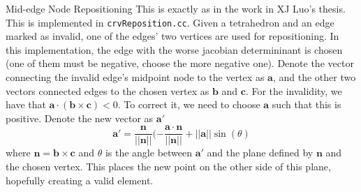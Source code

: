 \documentclass[12pt]{beamer}
\newcommand{\spa}{\vspace{0.5cm}\newline}
\begin{document}
\begin{frame}{Mid-edge Node Repositioning}
This is exactly as in the work in XJ Luo's thesis. This is implemented in \texttt{crvReposition.cc}. Given a tetrahedron and an edge marked as invalid, one of the edges' two vertices are used for repositioning. In this implementation, the edge with the worse jacobian determininant is chosen (one of them must be negative, choose the more negative one). \spa
Denote the vector connecting the invalid edge's midpoint node to the vertex as $\mathbf{a}$, and the other two vectors connected edges to the chosen vertex as $\mathbf{b}$ and $\mathbf{c}$. For the invalidity, we have that $\mathbf{a}\cdot (\mathbf{b}\times\mathbf{c}) < 0$. To correct it, we need to choose $\mathbf{a}$ such that this is positive. \spa
Denote the new vector as $\mathbf{a}'$ 
\[
\mathbf{a}' = \frac{\mathbf{n}}{||\mathbf{n}||}(-\frac{\mathbf{a}\cdot \mathbf{n}}{||\mathbf{n}||} + ||\mathbf{a}||\sin(\theta)
\]
where $\mathbf{n} = \mathbf{b}\times\mathbf{c} $ and $\theta$ is the angle between $\mathbf{a}'$ and the plane defined by $\mathbf{n}$ and the chosen vertex. This places the new point on the other side of this plane, hopefully creating a valid element.
\end{frame}
\end{document}
